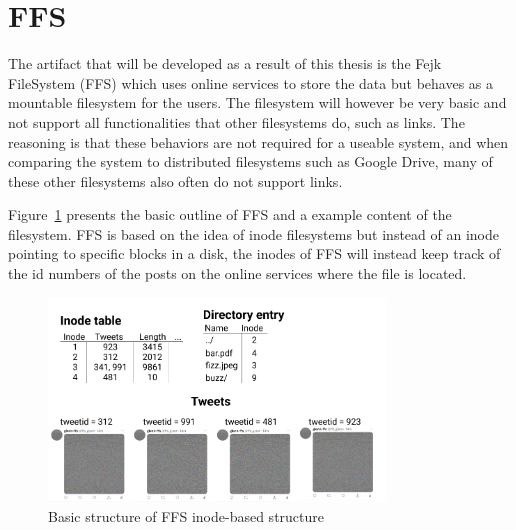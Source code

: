 \section{FFS}
The artifact that will be developed as a result of this thesis is the Fejk FileSystem (FFS) which uses online services to store the data but behaves as a mountable filesystem for the users. The filesystem will however be very basic and not support all functionalities that other filesystems do, such as links. The reasoning is that these behaviors are not required for a useable system, and when comparing the system to distributed filesystems such as Google Drive, many of these other filesystems also often do not support links.

Figure~\ref{fig:ffs_inode_diag} presents the basic outline of FFS and a example content of the filesystem. FFS is based on the idea of inode filesystems but instead of an inode pointing to specific blocks in a disk, the inodes of FFS will instead keep track of the id numbers of the posts on the online services where the file is located. 

\begin{figure}[!ht]
	\begin{center}
	  \includegraphics[width=0.8\textwidth]{figures/ffs_inode_diagram.png}
	\end{center}
	\caption{Basic structure of FFS inode-based structure}
	\label{fig:ffs_inode_diag}
\end{figure}

